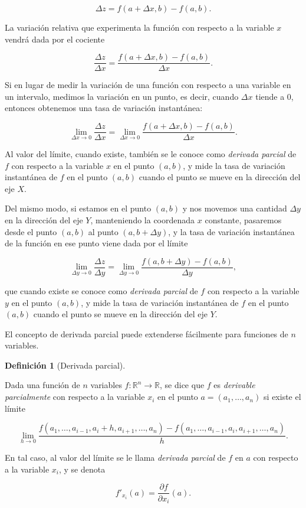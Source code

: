 \documentclass[
  a4paper,
]{scrreport}
\theoremstyle{plain}
\theoremstyle{plain}
\theoremstyle{definition}
\newtheorem{definition}{Definición}[chapter]
\theoremstyle{definition}
\theoremstyle{plain}
\theoremstyle{definition}
\theoremstyle{remark}
\begin{document}
\[
\Delta z=f(a+\Delta x,b)-f(a,b).
\]

La variación relativa que experimenta la función con respecto a la
variable \(x\) vendrá dada por el cociente

\[
\frac{\Delta z}{\Delta x}=\frac{f(a+\Delta x,b)-f(a,b)}{\Delta x}.
\]

Si en lugar de medir la variación de una función con respecto a una
variable en un intervalo, medimos la variación en un punto, es decir,
cuando \(\Delta x\) tiende a 0, entonces obtenemos una tasa de variación
instantánea:

\[
\lim_{\Delta x\rightarrow 0}\frac{\Delta z}{\Delta x}=\lim_{\Delta x \rightarrow 0}\frac{f(a+\Delta x,b)-f(a,b)}{\Delta x}.
\]

Al valor del límite, cuando existe, también se le conoce como
\emph{derivada parcial} de \(f\) con respecto a la variable \(x\) en el
punto \((a,b)\), y mide la tasa de variación instantánea de \(f\) en el
punto \((a,b)\) cuando el punto se mueve en la dirección del eje \(X\).

Del mismo modo, si estamos en el punto \((a,b)\) y nos movemos una
cantidad \(\Delta y\) en la dirección del eje \(Y\), manteniendo la
coordenada \(x\) constante, pasaremos desde el punto \((a,b)\) al punto
\((a,b+\Delta y)\), y la tasa de variación instantánea de la función en
ese punto viene dada por el límite

\[
\lim_{\Delta y\rightarrow 0}\frac{\Delta z}{\Delta y}=\lim_{\Delta y \rightarrow 0}\frac{f(a,b+\Delta y)-f(a,b)}{\Delta y},
\]

que cuando existe se conoce como \emph{derivada parcial} de \(f\) con
respecto a la variable \(y\) en el punto \((a,b)\), y mide la tasa de
variación instantánea de \(f\) en el punto \((a,b)\) cuando el punto se
mueve en la dirección del eje \(Y\).

El concepto de derivada parcial puede extenderse fácilmente para
funciones de \(n\) variables.

\begin{definition}[Derivada
parcial]\protect\hypertarget{def-derivada-parcial}{}\label{def-derivada-parcial}

Dada una función de \(n\) variables
\(f:\mathbb{R}^n\rightarrow \mathbb{R}\), se dice que \(f\) es
\emph{derivable parcialmente} con respecto a la variable \(x_i\) en el
punto \(a=(a_1,\ldots,a_n)\) si existe el límite

\[
\lim_{h\rightarrow 0} \frac{f(a_1,\ldots,a_{i-1},a_i+h,a_{i+1},\ldots,a_n)-f(a_1,\ldots,a_{i-1},a_i,a_{i+1},\ldots,a_n)} {h}.
\]

En tal caso, al valor del límite se le llama \emph{derivada parcial} de
\(f\) en \(a\) con respecto a la variable \(x_i\), y se denota

\[
f'_{x_i}(a)=\frac{\partial f}{\partial x_i}(a).
\]

\end{definition}
\end{document}
